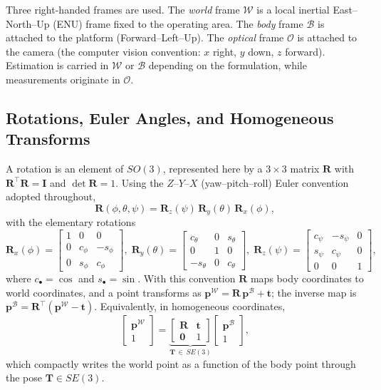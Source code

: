 Three right-handed frames are used. The \emph{world} frame $\mathcal{W}$ is a
local inertial East--North--Up (ENU) frame fixed to the operating area. The
\emph{body} frame $\mathcal{B}$ is attached to the platform (Forward--Left--Up).
The \emph{optical} frame $\mathcal{O}$ is attached to the camera (the computer
vision convention: $x$ right, $y$ down, $z$ forward). Estimation is carried in
$\mathcal{W}$ or $\mathcal{B}$ depending on the formulation, while measurements
originate in $\mathcal{O}$.

\subsection{Rotations, Euler Angles, and Homogeneous Transforms}

A rotation is an element of $SO(3)$, represented here by a $3\times3$ matrix
$\bm{R}$ with $\bm{R}^{\top}\bm{R}=\bm{I}$ and $\det\bm{R}=1$. Using the
$Z$--$Y$--$X$ (yaw--pitch--roll) Euler convention adopted throughout,
\begin{equation}
  \bm{R}(\phi,\theta,\psi) = \bm{R}_z(\psi)\,\bm{R}_y(\theta)\,\bm{R}_x(\phi),
  \label{eq:euler}
\end{equation}
with the elementary rotations
\begin{equation}
  \bm{R}_x(\phi)=\!\begin{bmatrix}1&0&0\\0&c_\phi&-s_\phi\\0&s_\phi&c_\phi\end{bmatrix}\!,\;
  \bm{R}_y(\theta)=\!\begin{bmatrix}c_\theta&0&s_\theta\\0&1&0\\-s_\theta&0&c_\theta\end{bmatrix}\!,\;
  \bm{R}_z(\psi)=\!\begin{bmatrix}c_\psi&-s_\psi&0\\s_\psi&c_\psi&0\\0&0&1\end{bmatrix}\!,
  \label{eq:elementary}
\end{equation}
where $c_\bullet=\cos$ and $s_\bullet=\sin$. With this convention $\bm{R}$ maps
body coordinates to world coordinates, and a point transforms as
$\bm{p}^{\mathcal{W}}=\bm{R}\,\bm{p}^{\mathcal{B}}+\bm{t}$; the inverse map is
$\bm{p}^{\mathcal{B}}=\bm{R}^{\top}(\bm{p}^{\mathcal{W}}-\bm{t})$. Equivalently, in
homogeneous coordinates,
\begin{equation}
  \begin{bmatrix} \bm{p}^{\mathcal{W}} \\ 1 \end{bmatrix}
  = \underbrace{\begin{bmatrix} \bm{R} & \bm{t} \\ \bm{0} & 1 \end{bmatrix}}_{\bm{T}\,\in\, SE(3)}
    \begin{bmatrix} \bm{p}^{\mathcal{B}} \\ 1 \end{bmatrix},
  \label{eq:se3_transform}
\end{equation}
which compactly writes the world point as a function of the body point through the
pose $\bm{T}\in SE(3)$.

